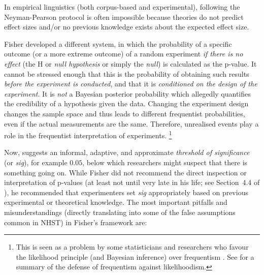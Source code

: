In empirical linguistics (both corpus-based and experimental), following the Neyman-Pearson protocol is often impossible because theories do not predict effect sizes and\slash or no previous knowledge exists about the expected effect size.

Fisher developed a different system, in which the probability of a specific outcome (or a more extreme outcome) of a random experiment \textit{if there is no effect} (the H or \textit{null hypothesis} or simply the \textit{null}) is calculated as the p-value.
It cannot be stressed enough that this is the probability of obtaining such results \textit{before the experiment is conducted}, and that it is \textit{conditioned on the design of the experiment}.
It is \textit{not} a Bayesian posterior probability which allegedly quantifies the credibility of a hypothesis given the data.
Changing the experiment design changes the sample space and thus leads to different frequentist probabilities, even if the actual measurements are the same.
Therefore, unrealised events play a role in the frequentist interpretation of experiments.%
\footnote{This is seen as a problem by some statisticians and researchers who favour the likelihood principle (and Bayesian inference) over frequentism \citep{Birnbaum1962}.
See \citet{Mayo2014} for a summary of the defense of frequentism against likelihoodism.}

Now, \citet[504]{Fisher1926} suggests an informal, adaptive, and approximate \textit{threshold of significance} (or \textit{sig}), for example $0.05$, below which researchers might suspect that there is something going on.
While Fisher did not recommend the direct inspection or interpretation of p-values (at least not until very late in his life; see Section~4.4 of \citealt{Lehmann2011}), he recommended that experimenters set \textit{sig} appropriately based on previous experimental or theoretical knowledge.
The most important pitfalls and misunderstandings (directly translating into some of the false assumptions common in NHST) in Fisher's framework are:

\vspace{\baselineskip}

